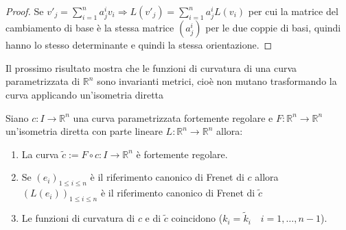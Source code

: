         \begin{proof}
        \mbox{}
        
        Se $\displaystyle v'_j = \sum_{i=1}^{n} a^i_j v_i \Rightarrow L(v'_j) = \sum_{i=1}^{n} a^i_j L(v_i)$ per cui la matrice del 
        cambiamento di base è la stessa matrice $\left(a^i_j\right)$ per le due coppie di basi, quindi hanno lo stesso determinante e quindi la stessa orientazione.
        \end{proof}
        \newpage
        Il prossimo risultato mostra che le funzioni di curvatura di una curva parametrizzata di $\mathbb{R}^n$ sono invarianti metrici, cioè non mutano trasformando la curva applicando
        un'isometria diretta
        \begin{proposizione}
        \label{prop:funzioni_di_curvatura_invarianti_metrici} 
        Siano $c \colon I \to \mathbb{R}^n$ una curva parametrizzata fortemente regolare e $F \colon \mathbb{R}^n \to \mathbb{R}^n$ un'isometria diretta con parte lineare
        $L \colon \mathbb{R}^n \to \mathbb{R}^n$ allora:
        \begin{enumerate}
            \item La curva $\tilde{c} := F \circ c \colon I \to \mathbb{R}^n$ è fortemente regolare.
            \item Se $\left(e_i\right)_{1 \leq i \leq n}$ è il riferimento canonico di Frenet di $c$ allora $\left(L(e_i)\right)_{1 \leq i \leq n}$ è 
            il riferimento canonico di Frenet di $\tilde{c}$
            \item Le funzioni di curvatura di $c$ e di $\tilde{c}$ coincidono \textcolor{blu}{($k_i= \tilde{k}_i \quad i=1, \dots, n-1$)}.
        \end{enumerate}
        \end{proposizione}
